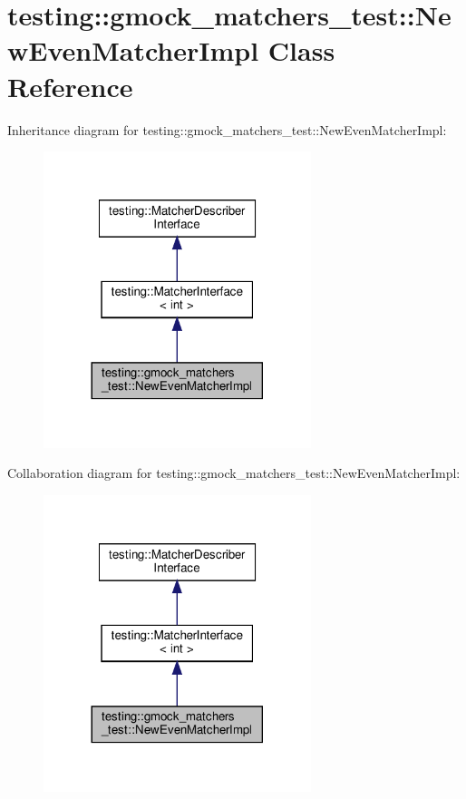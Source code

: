 \hypertarget{classtesting_1_1gmock__matchers__test_1_1_new_even_matcher_impl}{}\section{testing\+:\+:gmock\+\_\+matchers\+\_\+test\+:\+:New\+Even\+Matcher\+Impl Class Reference}
\label{classtesting_1_1gmock__matchers__test_1_1_new_even_matcher_impl}


Inheritance diagram for testing\+:\+:gmock\+\_\+matchers\+\_\+test\+:\+:New\+Even\+Matcher\+Impl\+:
\nopagebreak
\begin{figure}[H]
\begin{center}
\leavevmode
\includegraphics[width=221pt]{classtesting_1_1gmock__matchers__test_1_1_new_even_matcher_impl__inherit__graph}
\end{center}
\end{figure}


Collaboration diagram for testing\+:\+:gmock\+\_\+matchers\+\_\+test\+:\+:New\+Even\+Matcher\+Impl\+:
\nopagebreak
\begin{figure}[H]
\begin{center}
\leavevmode
\includegraphics[width=221pt]{classtesting_1_1gmock__matchers__test_1_1_new_even_matcher_impl__coll__graph}
\end{center}
\end{figure}
